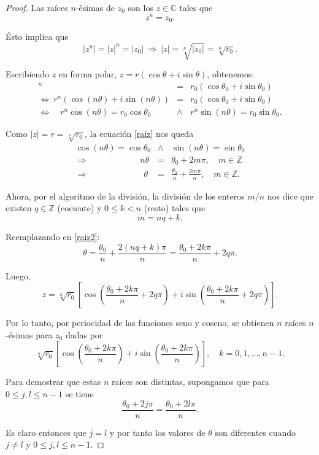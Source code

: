 \begin{proof}
Las raíces $n$-ésimas de $z_0$ son los $z \in \mathbb{C}$ tales que
$$z^n = z_0.$$

Ésto implica que
$$|z^n| = |z|^n = |z_0|~\Rightarrow~ |z| = \sqrt[n]{|z_0|} = \sqrt[n]{r_0}.$$

Escribiendo $z$ en forma polar, $z = r (\cos \theta + i \sin \theta)$, obtenemos:
\begin{eqnarray}
[r (\cos \theta + i \sin \theta)]^n &=& r_0 (\cos \theta_0 + i \sin\theta_0)  \\
\Leftrightarrow ~ r^n (\cos (n\theta) + i \sin (n\theta)) &=& r_0 (\cos \theta_0 + i \sin\theta_0) \\
\Leftrightarrow \quad r^n \cos(n\theta) = r_0 \cos\theta_0  &\wedge & r^n \sin (n\theta)  = r_0 \sin \theta_0. \label{raíz}
\end{eqnarray}

Como $|z| = r = \sqrt[n]{r_0}$, la ecuación \eqref{raíz} nos queda
\begin{eqnarray}
\cos(n\theta) = \cos\theta_0  &\wedge &   \sin (n\theta)  =  \sin \theta_0 \\
\Rightarrow \qquad \qquad \qquad n \theta &=& \theta_0 + 2 m\pi, \quad m \in \mathbb{Z} \\
\Rightarrow  \qquad \qquad \qquad ~~ \theta &=& \frac{\theta_0}{n} + \frac{2 m \pi}{n}, \quad m \in \mathbb{Z}. \label{raiz2}
\end{eqnarray}

Ahora, por el algoritmo de la división, la división de los enteros $m/n$ nos dice que existen $q \in \mathbb{Z}$ (cociente) y $0\leq k < n$ (resto) tales que
$$m = n q + k.$$

Reemplazando en \eqref{raiz2}:
$$\theta = \frac{\theta_0}{n} + \frac{2 (nq + k) \pi}{n} = \frac{\theta_0 + 2k\pi}{n} + 2q\pi.$$

Luego,
$$z = \sqrt[n]{r_0}  \left[ \cos \left( \frac{\theta_0 + 2k\pi}{n} + 2q\pi \right) + i \sin \left( \frac{\theta_0 + 2k\pi}{n} + 2q\pi\right)\right].$$

Por lo tanto, por periocidad de las funciones seno y coseno, se obtienen $n$ raíces $n$-ésimas para $z_0$ dadas por
$$\sqrt[n]{r_0} \left[ \cos \left( \frac{\theta_0 + 2k\pi}{n} \right) + i \sin \left( \frac{\theta_0 + 2k\pi}{n} \right)\right], \quad k = 0,1, \dots, n-1.$$

Para demostrar que estas $n$ raíces son distintas, supongamos que para $0 \leq j,l \leq n-1$ se tiene
$$\frac{\theta_0 + 2j\pi}{n} = \frac{\theta_0 + 2l\pi}{n}.$$
 
Es claro entonces que $j = l$ y por tanto los valores de $\theta$ son diferentes cuando $j\neq l$ y $0 \leq j,l \leq n-1$.

\end{proof}

